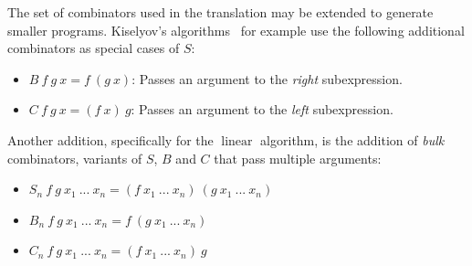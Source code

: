 \documentclass[conference]{IEEEtran}
\DeclareMathOperator{\linear}{linear}
\begin{document}
The set of combinators used in the translation may be extended to generate smaller programs.
Kiselyov's algorithms~\cite{kiselyov_lambda_2018} for example use the following additional combinators as special cases of $S$:

\begin{itemize}
    \item $B\ f\ g\ x = f\ (g\ x)$: Passes an argument to the \emph{right} subexpression.
    \item $C\ f\ g\ x = (f\ x)\ g$: Passes an argument to the \emph{left} subexpression.
\end{itemize}

Another addition, specifically for the $\linear$ algorithm, is the addition of \emph{bulk} combinators, variants of $S$, $B$ and $C$ that pass multiple arguments:

\begin{itemize}
    \item $S_n\ f\ g\ x_1\ ...\ x_n = (f\ x_1\ ...\ x_n)\ (g\ x_1\ ...\ x_n)$
    \item $B_n\ f\ g\ x_1\ ...\ x_n = f\ (g\ x_1\ ...\ x_n)$
    \item $C_n\ f\ g\ x_1\ ...\ x_n = (f\ x_1\ ...\ x_n)\ g$
\end{itemize}

%
%
%
%
%
\end{document}

